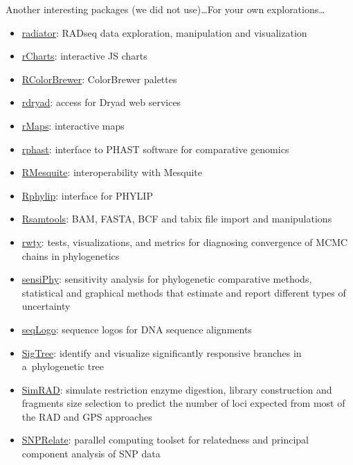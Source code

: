 \documentclass[compress, ucs, xelatex, 11pt, xcolor=svgnames,
	hyperref={
		bookmarks=true,
		unicode=true,
		colorlinks=true,
		pdftitle={Molecular data in R},
		plainpages=false,
		pdfauthor={Vojtech Zeisek},
		pdfsubject={Course about phylogeny and evolution in R},
		pdfcreator={XeLaTeX},
		pdfkeywords={R, evolution, phylogeny, molecular data},
		linkcolor=Tomato,
		anchorcolor=SaddleBrown,
		citecolor=Goldenrod,
		filecolor=DarkMagenta,
		menucolor=Sienna,
		urlcolor=DarkTurquoise,
		pdftex},
	url={hyphens, lowtilde} %
	]{beamer}
\begin{document}
\begin{frame}[allowframebreaks]{Another interesting packages (we did not use)\ldots}{For your own explorations\ldots}
\begin{itemize}
		\item \href{https://github.com/thierrygosselin/radiator}{radiator}: RADseq data exploration, manipulation and visualization
		\item \href{https://github.com/ramnathv/rCharts}{rCharts}: interactive JS charts
		\item \href{https://CRAN.R-project.org/package=RColorBrewer}{RColorBrewer}: ColorBrewer palettes
		\item \href{https://CRAN.R-project.org/package=rdryad}{rdryad}: access for Dryad web services
		\item \href{https://github.com/ramnathv/rMaps}{rMaps}: interactive maps
		\item \href{https://CRAN.R-project.org/package=rphast}{rphast}: interface to PHAST software for comparative genomics
		\item \href{https://r-forge.r-project.org/projects/rmesquite/}{RMesquite}: interoperability with Mesquite
		\item \href{https://CRAN.R-project.org/package=Rphylip}{Rphylip}: interface for PHYLIP
		\item \href{https://bioconductor.org/packages/release/bioc/html/Rsamtools.html}{Rsamtools}: BAM, FASTA, BCF and tabix file import and manipulations
		\item \href{https://CRAN.R-project.org/package=rwty}{rwty}: tests, visualizations, and metrics for diagnosing convergence of MCMC chains in phylogenetics
		\item \href{https://CRAN.R-project.org/package=sensiPhy}{sensiPhy}: sensitivity analysis for phylogenetic comparative methods,  statistical and graphical methods that estimate and report different types of uncertainty
		\item \href{https://www.bioconductor.org/packages/release/bioc/html/seqLogo.html}{seqLogo}: sequence logos for DNA sequence alignments
		\item \href{https://CRAN.R-project.org/package=SigTree}{SigTree}: identify and visualize significantly responsive branches in a~phylogenetic tree
		\item \href{https://CRAN.R-project.org/package=SimRAD}{SimRAD}: simulate restriction enzyme digestion, library construction and fragments size selection to predict the number of loci expected from most of the RAD and GPS approaches
		\item \href{https://www.bioconductor.org/packages/release/bioc/html/SNPRelate.html}{SNPRelate}: parallel computing toolset for relatedness and principal component analysis of SNP data

\end{itemize}
\end{frame}
\end{document}
